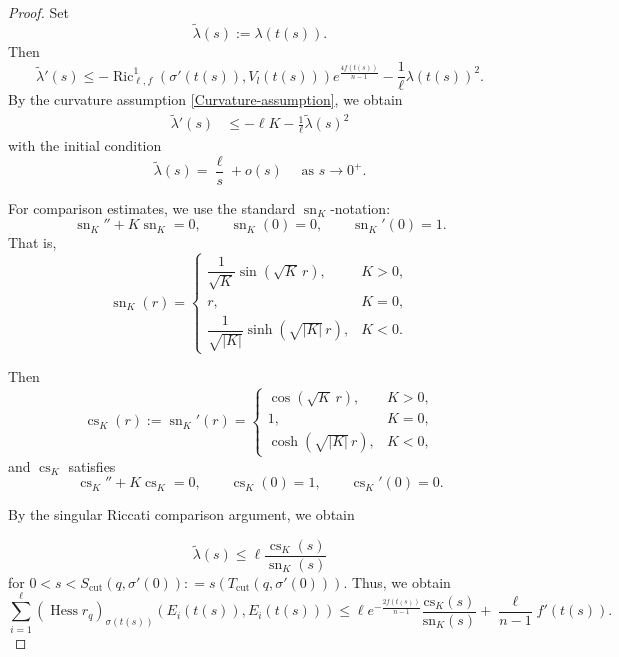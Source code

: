 \documentclass[psamsfonts]{amsart}
\theoremstyle{definition}
\theoremstyle{remark}
\DeclareMathOperator{\sn}{sn}
\DeclareMathOperator{\cs}{cs}
\numberwithin{equation}{section}
\begin{document}
\begin{proof}
Set
$$
    \widetilde{\lambda}(s):=\lambda(t(s)).
$$
Then
$$
    \widetilde{\lambda}'(s) \leq -\operatorname{Ric}^{1}_{\ell,f}(\sigma'(t(s)),V_l (t(s))) e^{\frac{4f(t(s))}{n-1}}
    -\frac{1}{\ell}\lambda(t(s))^2.
$$
By the curvature assumption \eqref{Curvature-assumption},
we obtain
\begin{align}
\widetilde{\lambda}'(s)
&\leq
-\ell K
-\frac{1}{\ell }\widetilde{\lambda}(s)^2  \label{Riccati-tangential}
\end{align}
with the initial condition
\begin{equation*}
   \widetilde{\lambda}(s) = \frac{\ell}{s} +o(s)\quad \text{ as }s \to 0^+.
\end{equation*}


For comparison estimates, we use the standard \(\sn_K\)-notation:
\[
\sn_K''+K\sn_K=0,
\qquad
\sn_K(0)=0,
\qquad
\sn_K'(0)=1.
\]
That is,
\[
\sn_K(r)=
\begin{cases}
\dfrac{1}{\sqrt K}\sin(\sqrt K\,r), & K>0,\\[1ex]
r, & K=0,\\[1ex]
\dfrac{1}{\sqrt{|K|}}\sinh(\sqrt{|K|}\,r), & K<0.
\end{cases}
\]

Then
\[
\cs_K(r):=\sn_K'(r)=
\begin{cases}
\cos(\sqrt K\,r), & K>0,\\[1ex]
1, & K=0,\\[1ex]
\cosh(\sqrt{|K|}\,r), & K<0,
\end{cases}
\]
and \(\cs_K\) satisfies
\[
\cs_K''+K\cs_K=0,
\qquad
\cs_K(0)=1,
\qquad
\cs_K'(0)=0.
\]

By the singular Riccati comparison argument, we obtain

$$\widetilde{\lambda} (s)\leq \ell \frac{\operatorname{cs}_K(s)}{\operatorname{sn}_K(s)}$$
for $ 0 <s< S_{\mathrm{cut}}(q,\sigma'(0)) : = s(T_{\mathrm{cut}}(q,\sigma'(0)))$.
Thus, we obtain
$$\sum_{i=1}^\ell (\operatorname{Hess} r_q)_{\sigma(t(s))}(E_i(t(s)), E_i(t(s))) \leq \ell e^{-\frac{2f(t(s))}{n-1}} \frac{\mathrm{cs}_K(s)}{\mathrm{sn}_K(s)} + \frac{\ell}{n-1} f'(t(s)).$$
\end{proof} 
\end{document}

